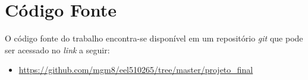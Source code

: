 %
%
%
%
%

%
%
%
%
%

\section{Código Fonte} \label{sec:source-code}

O código fonte do trabalho encontra-se disponível em um repositório \textit{git} que pode ser acessado no \textit{link} a seguir:

\begin{itemize}
    \item \href{https://github.com/mgm8/eel510265/tree/master/projeto_final}{https://github.com/mgm8/eel510265/tree/master/projeto\_final}
\end{itemize}
